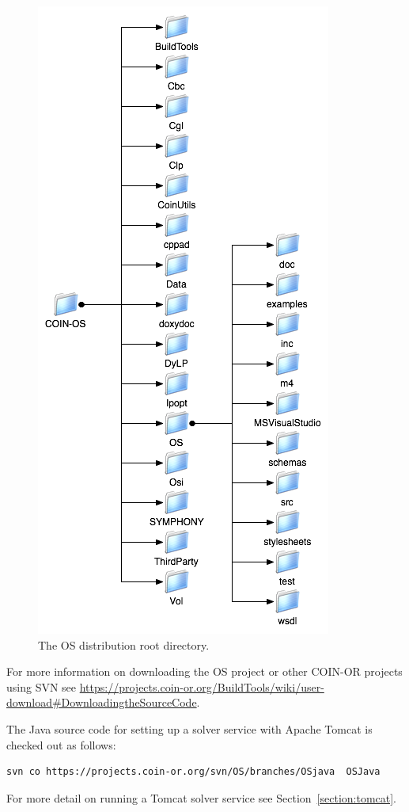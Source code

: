 \documentclass[11pt]{article}
\newcommand{\figurepath}{./figures}
\renewcommand{\_}{{\char"5F}}
\renewcommand{\{}{{\char"7B}}
\renewcommand{\}}{{\char"7D}}
\renewcommand{\^}{{\char"0D}}
\renewcommand{\'}{{\char"0D}}
\begin{document}
\begin{figure}
\centering
\includegraphics[scale=0.7]{./figures/OSProjectRootDirectory.png}
\caption{The OS distribution root directory.}
\label{figure:osprojectrootdir}
\end{figure}

For more information on downloading the OS project or other COIN-OR projects using SVN see 
\url{https://projects.coin-or.org/BuildTools/wiki/user-download#DownloadingtheSourceCode}.

The Java source code for  setting up a solver service with Apache Tomcat is checked out as follows:
\begin{verbatim}
svn co https://projects.coin-or.org/svn/OS/branches/OSjava  OSJava
\end{verbatim}
For more detail on running a Tomcat solver service  see  Section~\ref{section:tomcat}.
\end{document}
